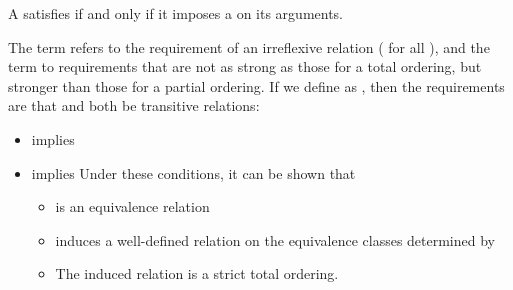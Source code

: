 \begin{itemdescr}
\pnum
A  satisfies  if and only if
it imposes a  on its arguments.

\pnum
The term
refers to the
requirement of an irreflexive relation ( for all ),
and the term
to requirements that are not as strong as
those for a total ordering,
but stronger than those for a partial
ordering.
If we define
as
,
then the requirements are that
and
both be transitive  relations:

\begin{itemize}
\item
{}
implies
\item
{}
implies
\enternote
Under these conditions, it can be shown that
\begin{itemize}
\item
{}
is an equivalence relation
\item
{}
induces a well-defined relation on the equivalence
classes determined by
\item
The induced relation is a strict total ordering.
\exitnote
\end{itemize}
\end{itemize}
\end{itemdescr}
